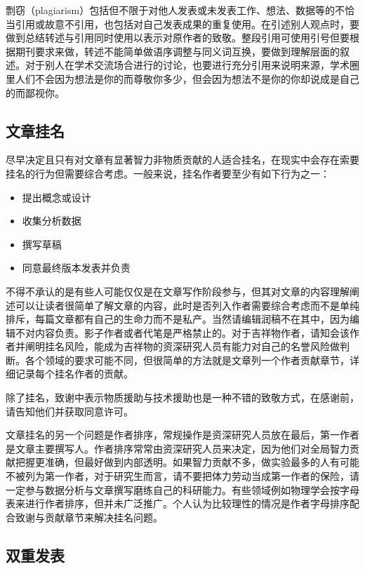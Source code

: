\documentclass[]{tufte-book}
\providecommand{\tightlist}{%
  \setlength{\itemsep}{0pt}\setlength{\parskip}{0pt}}
\begin{document}
剽窃（plagiarism）包括但不限于对他人发表或未发表工作、想法、数据等的不恰当引用或故意不引用，也包括对自己发表成果的重复使用。在引述别人观点时，要做到总结转述与引用同时使用以表示对原作者的致敬。整段引用可使用引号但要根据期刊要求来做，转述不能简单做语序调整与同义词互换，要做到理解层面的叙述。对于别人在学术交流场合进行的讨论，也要进行充分引用来说明来源，学术圈里人们不会因为想法是你的而尊敬你多少，但会因为想法不是你的你却说成是自己的而鄙视你。

\hypertarget{ux6587ux7ae0ux6302ux540d}{%
\subsection{文章挂名}\label{ux6587ux7ae0ux6302ux540d}}

尽早决定且只有对文章有显著智力非物质贡献的人适合挂名，在现实中会存在索要挂名的行为但需要综合考虑。一般来说，挂名作者要至少有如下行为之一：

\begin{itemize}
\tightlist
\item
  提出概念或设计
\item
  收集分析数据
\item
  撰写草稿
\item
  同意最终版本发表并负责
\end{itemize}

不得不承认的是有些人可能仅仅是在文章写作阶段参与，但其对文章的内容理解阐述可以让读者很简单了解文章的内容，此时是否列入作者需要综合考虑而不是单纯排斥，每篇文章都有自己的生命力而不是私产。当然请编辑润稿不在其中，因为编辑不对内容负责。影子作者或者代笔是严格禁止的。对于吉祥物作者，请知会该作者并阐明挂名风险，能成为吉祥物的资深研究人员有能力对自己的名誉风险做判断。各个领域的要求可能不同，但很简单的方法就是文章列一个作者贡献章节，详细记录每个挂名作者的贡献。

除了挂名，致谢中表示物质援助与技术援助也是一种不错的致敬方式，在感谢前，请告知他们并获取同意许可。

文章挂名的另一个问题是作者排序，常规操作是资深研究人员放在最后，第一作者是文章主要撰写人。作者排序常常由资深研究人员来决定，因为他们对全局智力贡献把握更准确，但最好做到内部透明。如果智力贡献不多，做实验最多的人有可能不被列为第一作者，对于研究生而言，请不要把体力劳动当成第一作者的保险，请一定参与数据分析与文章撰写磨练自己的科研能力。有些领域例如物理学会按字母表来进行作者排序，但并未广泛推广。个人认为比较理性的情况是作者字母排序配合致谢与贡献章节来解决挂名问题。

\hypertarget{ux53ccux91cdux53d1ux8868}{%
\subsection{双重发表}\label{ux53ccux91cdux53d1ux8868}}
\end{document}
